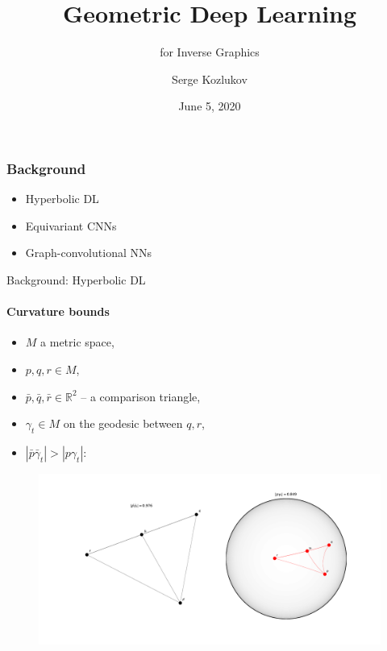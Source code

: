 \documentclass{beamer}
\title{Geometric Deep Learning}
\subtitle{for Inverse Graphics}
\author{Serge Kozlukov}
\institute{Skoltech}
\date{June 5, 2020}
\begin{document}
\frame{\titlepage}

\begin{frame}\frametitle{Background}
    \begin{itemize}
            \item Hyperbolic DL
            \item Equivariant CNNs
            \item Graph-convolutional NNs
    \end{itemize}
\end{frame}

\begin{frame}{Background: Hyperbolic DL}
    \framesubtitle{Curvature bounds}

    \begin{itemize}
        \item \( M \) a metric space,
        \item \( p, q, r \in M \),
        \item \( \bar{p}, \bar{q}, \bar{r} \in \mathbb{R}^2 \) -- a comparison triangle,
        \item \( \gamma_t \in M \) on the geodesic between \( q, r \),
        \item \( |\bar{p}\bar{\gamma}_t| > |p\gamma_t| \):
    \end{itemize}

    \begin{figure}\centering
        \includegraphics[width=.85\linewidth]{art/triangle-comparison.pdf}
    \end{figure}
\end{frame}
\end{document}
